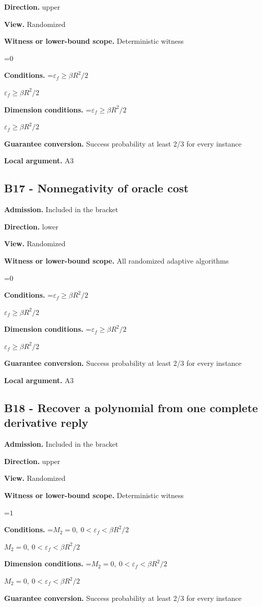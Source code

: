 \documentclass[10pt,a4paper]{article}
\newcommand{\AtlasMath}[1]{\par\begingroup\centering\setbox0=\hbox{$\displaystyle #1$}\ifdim\wd0>1.4\linewidth\typeout{ATLAS WIDE FORMULA: \the\wd0}\fi\ifdim\wd0>\linewidth\resizebox{\linewidth}{!}{\box0}\else\box0\fi\par\endgroup}
\newcommand{\AtlasInlineMath}[1]{\begingroup\setbox0=\hbox{$#1$}\ifdim\wd0>.4\linewidth\endgroup\AtlasMath{#1}\else\endgroup$#1$\fi}
\begin{document}
\textbf{Direction.} upper

\textbf{View.} Randomized

\textbf{Witness or lower-bound scope.} Deterministic witness

\AtlasMath{0}
\textbf{Conditions.} \AtlasInlineMath{\varepsilon_f\ge\beta R^2/2}

\textbf{Dimension conditions.} \AtlasInlineMath{\varepsilon_f\ge\beta R^2/2}

\textbf{Guarantee conversion.} Success probability at least 2/3 for every instance

\textbf{Local argument.} A3

\subsection{B17 - Nonnegativity of oracle cost}
\textbf{Admission.} Included in the bracket

\textbf{Direction.} lower

\textbf{View.} Randomized

\textbf{Witness or lower-bound scope.} All randomized adaptive algorithms

\AtlasMath{0}
\textbf{Conditions.} \AtlasInlineMath{\varepsilon_f\ge\beta R^2/2}

\textbf{Dimension conditions.} \AtlasInlineMath{\varepsilon_f\ge\beta R^2/2}

\textbf{Guarantee conversion.} Success probability at least 2/3 for every instance

\textbf{Local argument.} A3

\subsection{B18 - Recover a polynomial from one complete derivative reply}
\textbf{Admission.} Included in the bracket

\textbf{Direction.} upper

\textbf{View.} Randomized

\textbf{Witness or lower-bound scope.} Deterministic witness

\AtlasMath{1}
\textbf{Conditions.} \AtlasInlineMath{M_2=0,\ 0<\varepsilon_f<\beta R^2/2}

\textbf{Dimension conditions.} \AtlasInlineMath{M_2=0,\ 0<\varepsilon_f<\beta R^2/2}

\textbf{Guarantee conversion.} Success probability at least 2/3 for every instance
\end{document}
